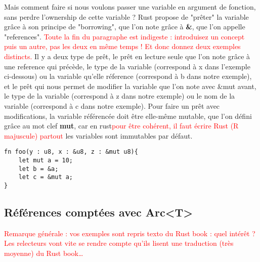 \documentclass{article}
\newcommand{\TODO}[1]{\textcolor{red}{#1}}
\begin{document}
Mais comment faire si nous voulons passer une variable en argument de fonction, sans perdre l'ownership de cette variable ? Rust propose de "prêter" la variable grâce à son principe de "borrowing", que l'on note grâce à \textbf{\&}, que l'on appelle "references". \TODO{Toute la fin du paragraphe est indigeste : introduisez un concept puis un autre, pas les deux en même temps ! Et donc donnez deux exemples distincts.} Il y a deux type de prêt, le prêt en lecture seule que l'on note grâce à une reference qui précède, le type de la variable (correspond à x dans l'exemple ci-dessous) ou la variable qu'elle réference (correspond à b dans notre exemple), et le prêt qui nous permet de modifier la variable que l'on note avec \&mut avant, le type de la variable (correspond à z dans notre exemple) ou le nom de la variable (correspond à c dans notre exemple). Pour faire un prêt avec modifications, la variable référencée doit être elle-même mutable, que l'on défini grâce au mot clef \textbf{mut}, car en rust\TODO{pour être cohérent, il faut écrire Rust (R majuscule) partout} les variables sont  immutables par défaut.

\begin{lstlisting}
fn foo(y : u8, x : &u8, z : &mut u8){
    let mut a = 10;
    let b = &a;
    let c = &mut a;
}
\end{lstlisting}


\subsection{Références comptées avec Arc<T>}

\TODO{Remarque générale : vos exemples sont repris texto du Rust book : quel intérêt ? Les relecteurs vont vite se rendre compte qu'ils lisent une traduction (très moyenne) du Rust book\ldots}
\end{document}
